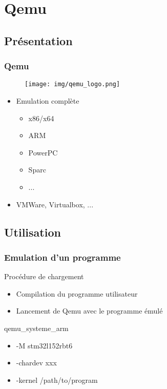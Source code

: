 \documentclass{beamer}
\begin{document}
	
	
	\section{Qemu}
		\subsection{Présentation}
			\begin{frame}
				\frametitle{Qemu}
				\begin{figure}
						\texttt{[image: img/qemu\_logo.png]}
					\end{figure}
				\begin{itemize}
					\item Emulation complète
						\begin{itemize}
							\item x86/x64
							\item ARM
							\item PowerPC
							\item Sparc
							\item ...
						\end{itemize}
					\item VMWare, Virtualbox, ...
				\end{itemize}
			\end{frame}
			
			
		\subsection{Utilisation}
			\begin{frame}
				\frametitle{Emulation d'un programme}
				\begin{block}{ Procédure de chargement }
					\begin{itemize}
						\item Compilation du programme utilisateur
						\item Lancement de Qemu avec le programme émulé
					\end{itemize}
					\begin{exampleblock}
						qemu\_systeme\_arm
						\begin{itemize}
							\item -M stm32l152rbt6
							\item -chardev xxx
							\item -kernel /path/to/program
						\end{itemize}
					\end{exampleblock}
				\end{block}
			\end{frame}
			
\end{document}
